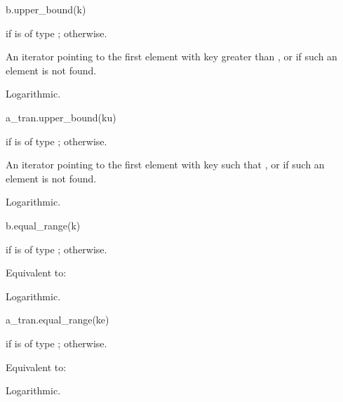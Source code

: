 %
\begin{itemdecl}
b.upper_bound(k)
\end{itemdecl}

\begin{itemdescr}
\pnum
\result
{} if  is of type ;
 otherwise.

\pnum
\returns
An iterator pointing to the first element with key greater than ,
or  if such an element is not found.

\pnum
\complexity
Logarithmic.
\end{itemdescr}

%
\begin{itemdecl}
a_tran.upper_bound(ku)
\end{itemdecl}

\begin{itemdescr}
\pnum
\result
{} if  is of type ;
 otherwise.

\pnum
\returns
An iterator pointing to the first element with key 
such that ,
or  if such an element is not found.

\pnum
\complexity
Logarithmic.
\end{itemdescr}

%
\begin{itemdecl}
b.equal_range(k)
\end{itemdecl}

\begin{itemdescr}
\pnum
\result
{}
if  is of type ;
 otherwise.

\pnum
\effects
Equivalent to: 

\pnum
\complexity
Logarithmic.
\end{itemdescr}

%
\begin{itemdecl}
a_tran.equal_range(ke)
\end{itemdecl}

\begin{itemdescr}
\pnum
\result
{}
if  is of type ;
 otherwise.

\pnum
\effects
Equivalent to:

\pnum
\complexity
Logarithmic.
\end{itemdescr}

